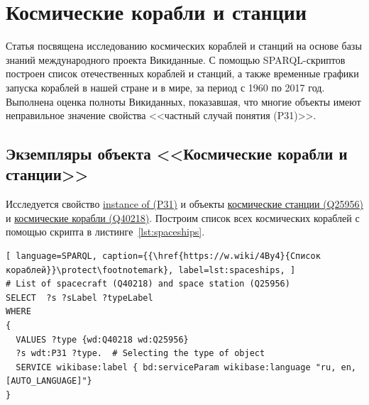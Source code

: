 \chapter{Космические корабли и станции}
\label{ch:spacecraft-space-station}

Статья посвящена исследованию космических кораблей и станций на основе базы знаний международного проекта Викиданные. С помощью SPARQL-скриптов построен список отечественных кораблей и станций, а также временные графики запуска кораблей в нашей стране и в мире, за период с 1960 по 2017 год. Выполнена оценка полноты Викиданных, показавшая, что многие объекты имеют неправильное значение свойства <<частный случай понятия (P31)>>.
\section{Экземпляры объекта <<Космические корабли и станции>>}
Исследуется свойство \href{https://www.wikidata.org/wiki/Property:P31}{instance of (P31)} и объекты \href{https://www.wikidata.org/wiki/Q25956}{космические станции (Q25956)} и \href{https://www.wikidata.org/wiki/Q40218}{космические корабли (Q40218)}.
Построим список всех космических кораблей с помощью скрипта в листинге~\ref{lst:spaceships}.

\begin{lstlisting}[ language=SPARQL, caption={{\href{https://w.wiki/4By4}{Список кораблей}}\protect\footnotemark}, label=lst:spaceships, ]
# List of spaceсraft (Q40218) and space station (Q25956)
SELECT  ?s ?sLabel ?typeLabel
WHERE
{
  VALUES ?type {wd:Q40218 wd:Q25956}
  ?s wdt:P31 ?type.  # Selecting the type of object
  SERVICE wikibase:label { bd:serviceParam wikibase:language "ru, en, [AUTO_LANGUAGE]"}
}
\end{lstlisting}
